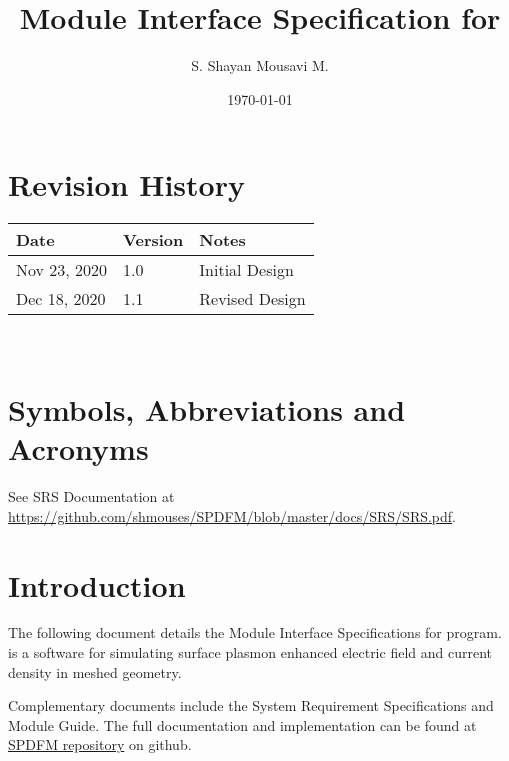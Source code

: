 \documentclass[12pt, titlepage]{article}
\begin{document}
	
	\title{Module Interface Specification for \progname{}}
	
	\author{S. Shayan Mousavi M.}
	
	\date{\today}
	
	\maketitle
	
	
	\section{Revision History}
	
	\begin{tabularx}{\textwidth}{p{3cm}p{2cm}X} \toprule {\bf Date} & {\bf Version}
		& {\bf Notes}\\ \midrule Nov 23, 2020 & 1.0 & Initial Design\\ Dec 18, 2020 &
		1.1 & Revised Design\\ \bottomrule \end{tabularx}
	
	~\newpage
	
	\section{Symbols, Abbreviations and Acronyms}
	
	See SRS Documentation at
	\url{https://github.com/shmouses/SPDFM/blob/master/docs/SRS/SRS.pdf}.
	
	
	\newpage
	
	\tableofcontents
	
	\newpage
	
	
	\section{Introduction}
	
	The following document details the Module Interface Specifications for
	\progname{} program. \progname{} is a software for simulating surface plasmon
	enhanced electric field and current density in meshed geometry.
	
	Complementary documents include the System Requirement Specifications and
	Module Guide.  The full documentation and implementation can be found at
	\href{https://github.com/shmouses/SPDFM}{SPDFM repository} on github.
	
\end{document}
